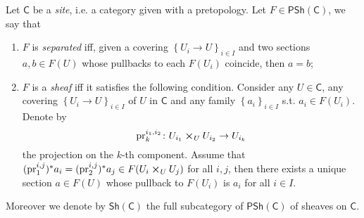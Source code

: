 \documentclass[../Main]{subfiles}
\begin{document}
\begin{defn}[Sheaves]
	Let $\mathsf{C}$ be a {\em site}, i.e. a category given with a pretopology.
	Let $F \in \mathsf{PSh}(\mathsf{C})$, we say that
\begin{enumerate}
	\item $F$ is {\em separated} iff, given a covering $\left\{ U_{ i } \to U \right\}_{ i \in I }$
		and two sections $a,b \in F(U)$ whose pullbacks to each $F(U_i)$ coincide,
		then $a = b$;
	\item $F$ is a {\em sheaf} iff it satisfies the following condition.
		Consider any $U \in \mathsf{C}$, any covering $\left\{ U_{ i } \to U \right\}_{ i \in I }$
		of $U$ in $\mathsf{C}$ and any family $\left\{ a_i \right\}_{i \in I}$ s.t.
		$a_i \in F(U_i)$.
		Denote by 
		\begin{equation*}
		\mathrm{pr}^{i_1,i_2}_k\colon U_{i_1} \cross_{ U } U_{i_2} \to U_{i_k}
		\end{equation*} 
		the projection on the $k$-th component.
		Assume that $(\mathrm{pr}^{i,j}_1)^* a_i = 
		(\mathrm{pr}^{i,j}_2)^* a_j \in F( U_i \cross_{ U } U_j )$
		for all $i, j$, then there exists a unique section $a \in F(U)$
		whose pullback to $F(U_i)$ is $a_i$ for all $i \in I$.
\end{enumerate}
	Moreover we denote by $\mathsf{Sh}(\mathsf{C})$ the full subcategory of $\mathsf{PSh}(\mathsf{C})$
	of sheaves on $\mathsf{C}$.
\end{defn}
\end{document}
